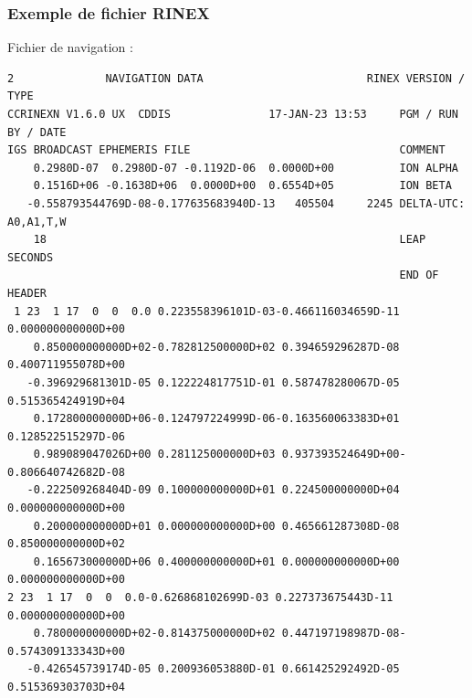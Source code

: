 \documentclass[xcolor=dvipsnames,envcountsect]{beamer}
\begin{document}
\begin{frame}
	\frametitle{Exemple de fichier RINEX}

	Fichier de navigation :
	\begin{lstlisting}[basicstyle=\tiny]
2              NAVIGATION DATA                         RINEX VERSION / TYPE
CCRINEXN V1.6.0 UX  CDDIS               17-JAN-23 13:53     PGM / RUN BY / DATE 
IGS BROADCAST EPHEMERIS FILE                                COMMENT             
	0.2980D-07  0.2980D-07 -0.1192D-06  0.0000D+00          ION ALPHA           
	0.1516D+06 -0.1638D+06  0.0000D+00  0.6554D+05          ION BETA            
   -0.558793544769D-08-0.177635683940D-13   405504     2245 DELTA-UTC: A0,A1,T,W
	18                                                      LEAP SECONDS        
															END OF HEADER       
 1 23  1 17  0  0  0.0 0.223558396101D-03-0.466116034659D-11 0.000000000000D+00
	0.850000000000D+02-0.782812500000D+02 0.394659296287D-08 0.400711955078D+00
   -0.396929681301D-05 0.122224817751D-01 0.587478280067D-05 0.515365424919D+04
	0.172800000000D+06-0.124797224999D-06-0.163560063383D+01 0.128522515297D-06
	0.989089047026D+00 0.281125000000D+03 0.937393524649D+00-0.806640742682D-08
   -0.222509268404D-09 0.100000000000D+01 0.224500000000D+04 0.000000000000D+00
	0.200000000000D+01 0.000000000000D+00 0.465661287308D-08 0.850000000000D+02
	0.165673000000D+06 0.400000000000D+01 0.000000000000D+00 0.000000000000D+00
2 23  1 17  0  0  0.0-0.626868102699D-03 0.227373675443D-11 0.000000000000D+00
	0.780000000000D+02-0.814375000000D+02 0.447197198987D-08-0.574309133343D+00
   -0.426545739174D-05 0.200936053880D-01 0.661425292492D-05 0.515369303703D+04
	\end{lstlisting}
\end{frame}
\end{document}
